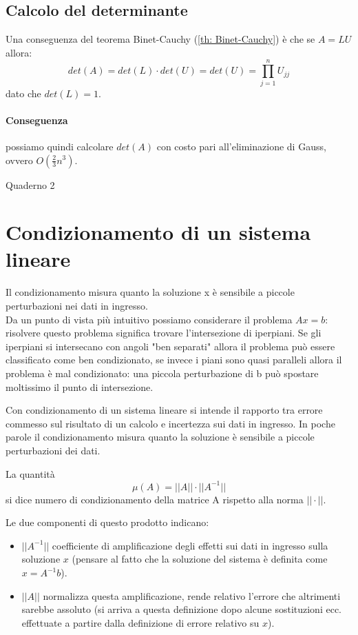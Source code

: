 \documentclass[12pt,a4paper,]{report}
\begin{document}
\subsection{Calcolo del determinante}
Una conseguenza del teorema Binet-Cauchy (\ref{th: Binet-Cauchy}) è che se $A=LU$ allora:
\[
det(A) = det(L)\cdot det(U) = det(U) = \prod_{j=1}^n U_{jj}
\]
dato che $det(L) = 1$.

\paragraph{Conseguenza} possiamo quindi calcolare $det(A)$ con costo pari all'eliminazione di Gauss, ovvero $O(\frac{2}{3}n^3)$.

\medskip\noindent
Quaderno 2

\section{Condizionamento di un sistema lineare}
\begin{nota}
    Il condizionamento misura quanto la soluzione x è sensibile a piccole perturbazioni nei dati in ingresso.
    \\
    Da un punto di vista più intuitivo possiamo considerare il problema $Ax=b$: risolvere questo problema significa trovare l'intersezione di iperpiani. Se gli iperpiani si intersecano con angoli "ben separati" allora il problema può essere classificato come ben condizionato, se invece i piani sono quasi paralleli allora il problema è mal condizionato: una piccola perturbazione di b può spostare moltissimo il punto di intersezione.
\end{nota}
\noindent
Con condizionamento di un sistema lineare si intende il rapporto tra errore commesso sul risultato di un calcolo e incertezza sui dati in ingresso.
In poche parole il condizionamento misura quanto la soluzione è sensibile a piccole perturbazioni dei dati.
\begin{definizione}
    \label{def: numero di condizionamento}
    La quantità
    \[
    \mu(A) = ||A||\cdot||A^{-1}||
    \]
    si dice numero di condizionamento della matrice A rispetto alla norma $||\cdot||$.
\end{definizione}
\begin{nota}
    Le due componenti di questo prodotto indicano:
    \begin{itemize}
        \item $||A^{-1}||$ coefficiente di amplificazione degli effetti sui dati in ingresso sulla soluzione $x$ (pensare al fatto che la soluzione del sistema è definita come $x = A^{-1}b$).
        \item $||A||$ normalizza questa amplificazione, rende relativo l'errore che altrimenti sarebbe assoluto (si arriva a questa definizione dopo alcune sostituzioni ecc. effettuate a partire dalla definizione di errore relativo su $x$).
    \end{itemize}
\end{nota}
\end{document}
